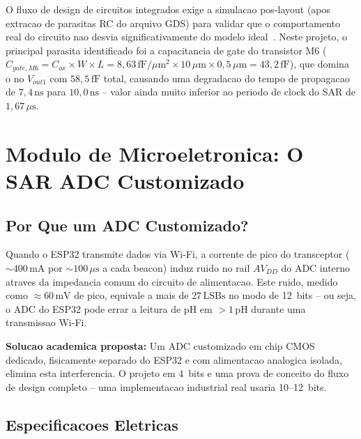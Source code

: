 \documentclass[12pt, a4paper]{article}
\begin{document}
O fluxo de design de circuitos integrados exige a simulacao pos-layout (apos extracao de
parasitas RC do arquivo GDS) para validar que o comportamento real do circuito nao desvia
significativamente do modelo ideal~\cite{razavi1995}. Neste projeto, o principal parasita
identificado foi a capacitancia de gate do transistor M6 ($C_{gate,M6} = C_{ox} \times W
\times L = 8{,}63\,\text{fF}/\mu\text{m}^2 \times 10\,\mu\text{m} \times 0{,}5\,\mu\text{m}
= 43{,}2\,\text{fF}$), que domina o no $V_{out1}$ com $58{,}5\,\text{fF}$ total, causando
uma degradacao do tempo de propagacao de $7{,}4\,\text{ns}$ para $10{,}0\,\text{ns}$ --
valor ainda muito inferior ao periodo de clock do SAR de $1{,}67\,\mu\text{s}$.

\section{Modulo de Microeletronica: O SAR ADC Customizado}

\subsection{Por Que um ADC Customizado?}

\begin{conceitobox}
Quando o ESP32 transmite dados via Wi-Fi, a corrente de pico do transceptor ($\sim 400\,\text{mA}$
por $\sim 100\,\mu\text{s}$ a cada beacon) induz ruido no rail $AV_{DD}$ do ADC interno atraves
da impedancia comum do circuito de alimentacao. Este ruido, medido como $\approx 60\,\text{mV}$
de pico, equivale a mais de $27\,\text{LSBs}$ no modo de 12~bits -- ou seja, o ADC do ESP32
pode errar a leitura de pH em $>1\,\text{pH}$ durante uma transmissao Wi-Fi.

\textbf{Solucao academica proposta:} Um ADC customizado em chip CMOS dedicado, fisicamente
separado do ESP32 e com alimentacao analogica isolada, elimina esta interferencia. O projeto
em 4~bits e uma prova de conceito do fluxo de design completo -- uma implementacao industrial
real usaria 10--12~bits.
\end{conceitobox}

\subsection{Especificacoes Eletricas}
\end{document}
